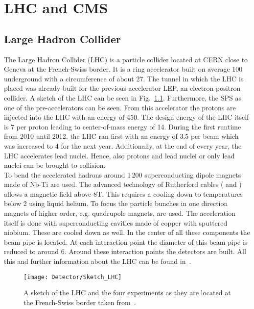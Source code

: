 \chapter{LHC and CMS \label{sec:LHCCMS}}

\section{Large Hadron Collider \label{LHCCMSLHC}}

The Large Hadron Collider (LHC) is a particle collider located at CERN close to Geneva at the French-Swiss border. It is a ring accelerator built on average 100\m{} underground with a circumference of about 27\km{}. The tunnel in which the LHC is placed was already built for the previous accelerator LEP, an electron-positron collider. A sketch of the LHC can be seen in Fig.~\ref{plot:LCHSketch}. Furthermore, the SPS as one of the pre-accelerators can be seen. From this accelerator the protons are injected into the LHC with an energy of 450\GeV{}. The design energy of the LHC itself is 7\TeV{} per proton leading to center-of-mass energy of 14\TeV{}. During the first runtime from 2010 until 2012, the LHC ran first with an energy of 3.5\TeV{} per beam which was increased to 4\TeV{} for the next year. Additionally, at the end of every year, the LHC accelerates lead nuclei. Hence, also protons and lead nuclei or only lead nuclei can be brought to collision. \\
To bend the accelerated hadrons around 1\,200 superconducting dipole magnets made of Nb-Ti are used. The advanced technology of Rutherford cables (\cite{RuthCables1} and \cite{RuthCables2}) allows a magnetic field above 8\unit{T}. This requires a cooling down to temperatures below 2\K{} using liquid helium. To focus the particle bunches in one direction magnets of higher order, e.g. quadrupole magnets, are used. The acceleration itself is done with superconducting cavities made of copper with sputtered niobium. These are cooled down as well. In the center of all these components the beam pipe is located. At each interaction point the diameter of this beam pipe is reduced to around 6\cm{}. Around these interaction points the detectors are built. All this and further information about the LHC can be found in~.

\begin{figure}[!ht]
  \centering
  \texttt{[image: Detector/Sketch\_LHC]}
  \caption[Sketch of the LHC]{A sketch of the LHC and the four experiments as they are located at the French-Swiss border taken from~\cite{Team:40525}. \label{plot:LCHSketch}}
\end{figure}

